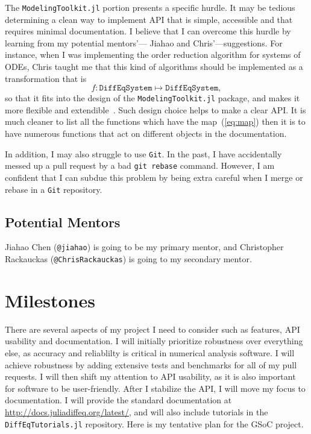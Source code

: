 \documentclass[12pt,a4paper]{article}
\begin{document}

The \texttt{ModelingToolkit.jl} portion presents a specific hurdle. It may be
tedious determining a clean way to implement API that is simple, accessible and
that requires minimal documentation. I believe that I can overcome this hurdle
by learning from my potential mentors'--- Jiahao and Chris'---suggestions. For
instance, when I was implementing the order reduction algorithm for systems of
ODEs, Chris taught me that this kind of algorithms should be implemented as a
transformation that is
\begin{equation}\label{eq:map}
  f: \texttt{DiffEqSystem}\mapsto \texttt{DiffEqSystem},
\end{equation}
so that it fits into the design of the \texttt{ModelingToolkit.jl} package, and
makes it more flexible and extendible~\cite{i49}. Such design choice helps to
make a clear API. It is much cleaner to list all the functions which have the
map~(\ref{eq:map}) then it is to have numerous functions that act on different
objects in the documentation.

In addition, I may also struggle to use \texttt{Git}. In the past, I have
accidentally messed up a pull request by a bad \texttt{git rebase} command.
However, I am confident that I can subdue this problem by being extra careful
when I merge or rebase in a \texttt{Git} repository.

\subsection{Potential Mentors}
Jiahao Chen (\texttt{@jiahao}) is going to be my primary mentor, and
Christopher Rackauckas (\texttt{@ChrisRackauckas}) is going to my secondary
mentor.

\section{Milestones}
There are several aspects of my project I need to consider such as features,
API usability and documentation. I will initially prioritize robustness over
everything else, as accuracy and reliablilty is critical in numerical analysis
software. I will achieve robustness by adding extensive tests and benchmarks
for all of my pull requests. I will then shift my attention to API usability,
as it is also important for software to be user-friendly. After I stabilize the
API, I will move my focus to documentation. I will provide the standard
documentation at \url{http://docs.juliadiffeq.org/latest/}, and will also
include tutorials in the \texttt{DiffEqTutorials.jl} repository. Here is my
tentative plan for the GSoC project.
\end{document}

